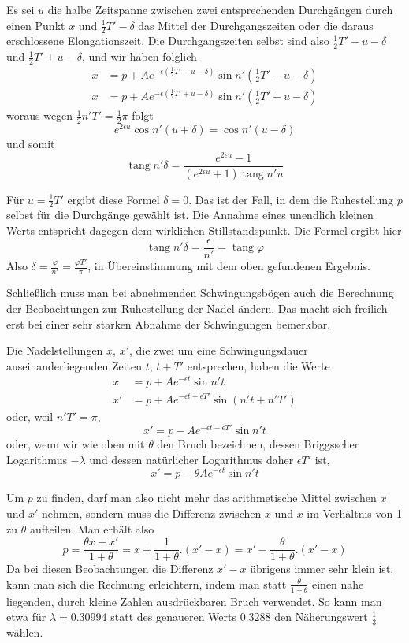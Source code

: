 Es sei $u$ die halbe Zeitspanne zwischen zwei entsprechenden Durchgängen durch einen Punkt $x$ und $\tfrac12T'-\delta$ das Mittel der Durchgangszeiten oder die daraus erschlossene Elongationszeit. Die Durchgangszeiten selbst sind also $\tfrac12T'-u-\delta$ und $\tfrac12T'+u-\delta$, und wir haben folglich
\[
\begin{aligned}
x&=p+Ae^{-\epsilon(\tfrac12T'-u-\delta)}\sin n'(\tfrac12T'-u-\delta)\\
x&=p+Ae^{-\epsilon(\tfrac12T'+u-\delta)}\sin n'(\tfrac12T'+u-\delta)
\end{aligned}
\]
woraus wegen $\tfrac12n'T'=\tfrac12\pi$ folgt
\[
e^{2\epsilon u}\cos n'(u+\delta)=\cos n'(u-\delta)
\]
und somit
\[
\operatorname{tang}n'\delta=\frac{e^{2\epsilon u}-1}{(e^{2\epsilon u}+1)\operatorname{tang}n'u}
\]

Für $u=\tfrac12T'$ ergibt diese Formel $\delta=0$. Das ist der Fall, in dem die Ruhestellung $p$ selbst für die Durchgänge gewählt ist. Die Annahme eines unendlich kleinen Werts entspricht dagegen dem wirklichen Stillstandspunkt. Die Formel ergibt hier
\[
\operatorname{tang}n'\delta=\frac{\epsilon}{n'}=\operatorname{tang}\varphi
\]
Also $\delta=\frac{\varphi}{n'}=\frac{\varphi T'}{\pi}$, in Übereinstimmung mit dem oben gefundenen Ergebnis.

Schließlich muss man bei abnehmenden Schwingungsbögen auch die Berechnung der Beobachtungen zur Ruhestellung der Nadel ändern. Das macht sich freilich erst bei einer sehr starken Abnahme der Schwingungen bemerkbar.

Die Nadelstellungen $x$, $x'$, die zwei um eine Schwingungsdauer auseinanderliegenden Zeiten $t$, $t+T'$ entsprechen, haben die Werte
\[
\begin{aligned}
x&=p+Ae^{-\epsilon t}\sin n't\\
x'&=p+Ae^{-\epsilon t-\epsilon T'}\sin(n't+n'T')
\end{aligned}
\]
oder, weil $n'T'=\pi$,
\[
x'=p-Ae^{-\epsilon t-\epsilon T'}\sin n't
\]
oder, wenn wir wie oben mit $\theta$ den Bruch bezeichnen, dessen Briggsscher Logarithmus $-\lambda$ und dessen natürlicher Logarithmus daher $\epsilon T'$ ist,
\[
x'=p-\theta Ae^{-\epsilon t}\sin n't
\]

Um $p$ zu finden, darf man also nicht mehr das arithmetische Mittel zwischen $x$ und $x'$ nehmen, sondern muss die Differenz zwischen $x$ und $x$ im Verhältnis von 1 zu $\theta$ aufteilen. Man erhält also
\[
p=\frac{\theta x+x'}{1+\theta}=x+\frac{1}{1+\theta}.(x'-x)=x'-\frac{\theta}{1+\theta}.(x'-x)
\]
Da bei diesen Beobachtungen die Differenz $x'-x$ übrigens immer sehr klein ist, kann man sich die Rechnung erleichtern, indem man statt $\frac{\theta}{1+\theta}$ einen nahe liegenden, durch kleine Zahlen ausdrückbaren Bruch
verwendet. So kann man etwa für $\lambda=0.30994$ statt des genaueren Werts $0.3288$ den Näherungswert $\tfrac13$ wählen.

